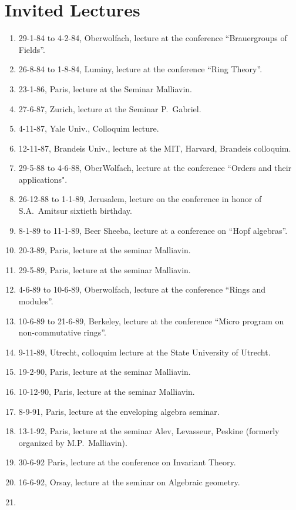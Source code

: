 \documentclass{amsart}
\begin{document}
\section*{Invited Lectures}
\begin{enumerate}
\item
29-1-84 to 4-2-84, Oberwolfach, lecture at the
conference ``Brauergroups of Fields''.
\item
26-8-84 to 1-8-84, Luminy, lecture at the
conference ``Ring Theory''.
\item
23-1-86, Paris, lecture at the Seminar Malliavin.
\item
27-6-87, Zurich, lecture at the Seminar P.~Gabriel.
\item
4-11-87, Yale Univ., Colloquim lecture.
\item
12-11-87, Brandeis Univ., lecture at the MIT, Harvard, Brandeis colloquim.
\item
29-5-88 to 4-6-88, OberWolfach, lecture at the conference
``Orders and their applications".
\item
26-12-88 to 1-1-89,
Jerusalem, lecture on the conference in honor of S.A.\ Amitsur sixtieth
birthday.
\item
8-1-89 to 11-1-89, Beer Sheeba, lecture at a conference on ``Hopf
algebras''. 
\item
20-3-89, Paris, lecture at the  seminar Malliavin.
\item
29-5-89, Paris, lecture at the  seminar Malliavin.
\item
4-6-89 to 10-6-89, Oberwolfach, lecture at the conference
``Rings and modules''.
\item
10-6-89 to 21-6-89, Berkeley, lecture at the conference ``Micro
program on non-commutative rings''.
\item
9-11-89, Utrecht, colloquim lecture at the State University of Utrecht.
\item
19-2-90, Paris, lecture at the seminar Malliavin.
\item
10-12-90, Paris, lecture at the seminar Malliavin.
\item
8-9-91, Paris, lecture at the enveloping algebra seminar.
\item
13-1-92, Paris, lecture at the seminar Alev, Levasseur, Peskine (formerly
organized by M.P.\ Malliavin).
\item
30-6-92 Paris, lecture at the conference on Invariant Theory.
\item
16-6-92, Orsay, lecture at the seminar on Algebraic geometry.
\item

\end{enumerate}
\end{document}
